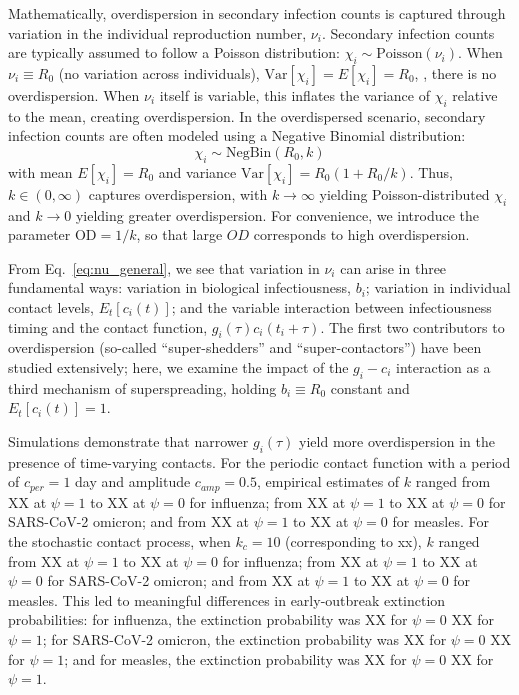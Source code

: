 Mathematically, overdispersion in secondary infection counts is captured through variation in the individual reproduction number, $\nu_i$. Secondary infection counts are typically assumed to follow a Poisson distribution: $\chi_i \sim \text{Poisson}(\nu_i)$. When $\nu_i \equiv R_0$ (no variation across individuals), $\text{Var}[\chi_i] = E[\chi_i] = R_0$, \ie, there is no overdispersion. When $\nu_i$ itself is variable, this inflates the variance of $\chi_i$ relative to the mean, creating overdispersion. In the overdispersed scenario, secondary infection counts are often modeled using a Negative Binomial distribution: 
\begin{equation}
	\chi_i \sim \text{NegBin}(R_0, k)
\end{equation}
with mean $E[\chi_i] = R_0$ and variance $\text{Var}[\chi_i] = R_0 (1 + R_0 / k)$. Thus, $k \in (0, \infty)$ captures overdispersion, with $k \rightarrow \infty$ yielding Poisson-distributed $\chi_i$ and $k \rightarrow 0$ yielding greater overdispersion. For convenience, we introduce the parameter $\text{OD} = 1/k$, so that large $OD$ corresponds to high overdispersion. 

From Eq.~\ref{eq:nu_general}, we see that variation in $\nu_i$ can arise in three fundamental ways: variation in biological infectiousness, $b_i$; variation in individual contact levels, $E_t[c_i(t)]$; and the variable interaction between infectiousness timing and the contact function, $g_i(\tau) c_i(t_i+\tau)$. The first two contributors to overdispersion (so-called ``super-shedders'' and ``super-contactors'') have been studied extensively; here, we examine the impact of the $g_i - c_i$ interaction as a third mechanism of superspreading, holding $b_i \equiv R_0$ constant and $E_t[c_i(t)] = 1$. 

Simulations demonstrate that narrower $g_i(\tau)$ yield more overdispersion in the presence of time-varying contacts. For the periodic contact function with a period of $c_{per} = 1$ day and amplitude $c_{amp} = 0.5$, empirical estimates of $k$ ranged from XX at $\psi = 1$ to XX at $\psi = 0$ for influenza; from XX at $\psi = 1$ to XX at $\psi = 0$ for SARS-CoV-2 omicron; and from XX at $\psi = 1$ to XX at $\psi = 0$ for measles. For the stochastic contact process, when $k_c = 10$ (corresponding to xx), $k$ ranged from XX at $\psi = 1$ to XX at $\psi = 0$ for influenza; from XX at $\psi = 1$ to XX at $\psi = 0$ for SARS-CoV-2 omicron; and from XX at $\psi = 1$ to XX at $\psi = 0$ for measles. This led to meaningful differences in early-outbreak extinction probabilities: for influenza, the extinction probability was XX for $\psi = 0$ \vs XX for $\psi = 1$; for SARS-CoV-2 omicron, the extinction probability was XX for $\psi = 0$ \vs XX for $\psi = 1$; and for measles, the extinction probability was XX for $\psi = 0$ \vs XX for $\psi = 1$. 

